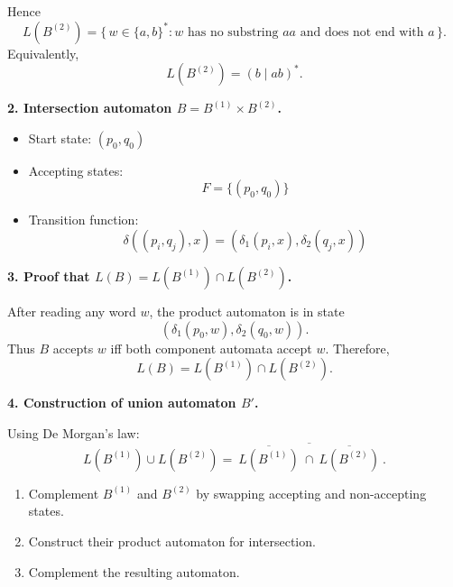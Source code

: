 \documentclass[11pt, a4paper]{article}
\theoremstyle{definition}
\theoremstyle{remark}
\begin{document}
Hence
\[
L(B^{(2)})=\{\,w\in\{a,b\}^* : \text{$w$ has no substring $aa$ and does not end with $a$}\,\}.
\]
Equivalently,
\[
L(B^{(2)}) = (b \mid ab)^*.
\]

\medskip
\textbf{2. Intersection automaton $B = B^{(1)} \times B^{(2)}$.}

\begin{itemize}
\item Start state: $(p_0,q_0)$
\item Accepting states:
\[
F = \{(p_0,q_0)\}
\]
\item Transition function:
\[
\delta((p_i,q_j),x)=(\delta_1(p_i,x),\delta_2(q_j,x))
\]
\end{itemize}

\begin{center}
\end{center}

\medskip
\textbf{3. Proof that $L(B)=L(B^{(1)})\cap L(B^{(2)})$.}

After reading any word $w$, the product automaton is in state
\[
(\delta_1(p_0,w),\delta_2(q_0,w)).
\]
Thus $B$ accepts $w$ iff both component automata accept $w$.
Therefore,
\[
L(B)=L(B^{(1)})\cap L(B^{(2)}).
\]

\medskip
\textbf{4. Construction of union automaton $B'$.}

Using De Morgan's law:
\[
L(B^{(1)})\cup L(B^{(2)})
=
\overline{\ \overline{L(B^{(1)})}\ \cap\ \overline{L(B^{(2)})}\ }.
\]

\begin{enumerate}
\item Complement $B^{(1)}$ and $B^{(2)}$ by swapping accepting and non-accepting states.
\item Construct their product automaton for intersection.
\item Complement the resulting automaton.
\end{enumerate}
\end{document}
